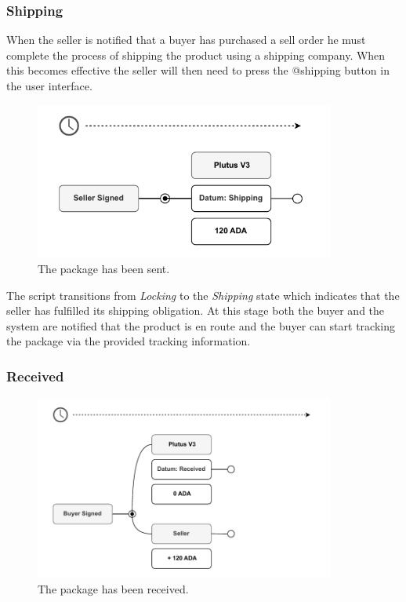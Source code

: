 \documentclass[12pt]{article}
\begin{document}
\subsubsection { Shipping }

When the seller is notified that a buyer has purchased a sell order he must complete the process of shipping the product using a shipping company. When this becomes effective the seller will then need to press the @shipping button in the user interface.

\begin{figure}[ht]
  \centering
  \includegraphics[width=0.88\textwidth, keepaspectratio]{3.pdf}
  \caption{The package has been sent.}  
  \label{fig:delivered}
\end{figure}
The script transitions from \emph{Locking} to the \emph{Shipping} state which indicates that the seller has fulfilled its shipping obligation. At this stage both the buyer and the system are notified that the product is en route and the buyer can start tracking the package via the provided tracking information.

\subsubsection { Received }

\begin{figure}[ht]
  \centering
  \includegraphics[width=0.88\textwidth, keepaspectratio]{4.pdf}
  \caption{The package has been received.}
  \label{fig:delivered}
\end{figure}
\end{document}
